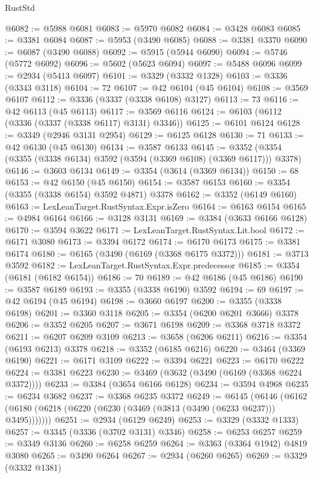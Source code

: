 \begin{lexlean}{RustStd}
\begin{coremodule}
@6082 := @5988 @6081
@6083 := @5970 @6082
@6084 := @3428 @6083
@6085 := @3381 @6084
@6087 := @5953 (@3490 @6085)
@6088 := @3381 @3370
@6090 := @6087 (@3490 @6088)
@6092 := @5915 (@5944 @6090)
@6094 := @5746 (@5772 @6092)
@6096 := @5602 (@5623 @6094)
@6097 := @5488 @6096
@6099 := @2934 (@5413 @6097)
@6101 := @3329 (@3332 @1328)
@6103 := @3336 (@3343 @3118)
@6104 := 72
@6107 := @42 @6104 (@45 @6104)
@6108 := @3569 @6107
@6112 := @3336 (@3337 (@3338 @6108) @3127)
@6113 := 73
@6116 := @42 @6113 (@45 @6113)
@6117 := @3569 @6116
@6124 := @6103 (@6112 (@3336 (@3337 (@3338 @6117) @3131) @3346))
@6125 := @6101 @6124
@6128 := @3349 (@2946 @3131 @2954)
@6129 := @6125 @6128
@6130 := 71
@6133 := @42 @6130 (@45 @6130)
@6134 := @3587 @6133
@6145 := @3352 (@3354 (@3355 (@3338 @6134) @3592 (@3594 (@3369 @6108) (@3369 @6117))) @3378)
@6146 := @3603 @6134
@6149 := @3354 (@3614 (@3369 @6134))
@6150 := 68
@6153 := @42 @6150 (@45 @6150)
@6154 := @3587 @6153
@6160 := @3354 (@3355 (@3338 @6154) @3592 @4871) @3378
@6162 := @3352 (@6149 @6160)
@6163 := LexLeanTarget.RustSyntax.Expr.isZero
@6164 := @6163 @6154
@6165 := @4984 @6164
@6166 := @3128 @3131
@6169 := @3384 (@3633 @6166 @6128)
@6170 := @3594 @3622
@6171 := LexLeanTarget.RustSyntax.Lit.bool
@6172 := @6171 @3080
@6173 := @3394 @6172
@6174 := @6170 @6173
@6175 := @3381 @6174
@6180 := @6165 (@3490 (@6169 (@3368 @6175 @3372)))
@6181 := @3713 @3592
@6182 := LexLeanTarget.RustSyntax.Expr.predecessor
@6185 := @3354 (@6181 (@6182 @6154))
@6186 := 70
@6189 := @42 @6186 (@45 @6186)
@6190 := @3587 @6189
@6193 := @3355 (@3338 @6190) @3592
@6194 := 69
@6197 := @42 @6194 (@45 @6194)
@6198 := @3660 @6197
@6200 := @3355 (@3338 @6198)
@6201 := @3360 @3118
@6205 := @3354 (@6200 @6201 @3666) @3378
@6206 := @3352 @6205
@6207 := @3671 @6198
@6209 := @3368 @3718 @3372
@6211 := @6207 @6209 @3109
@6213 := @3658 (@6206 @6211)
@6216 := @3354 (@6193 @6213) @3378
@6218 := @3352 (@6185 @6216)
@6220 := @3464 (@3369 @6190)
@6221 := @6171 @3109
@6222 := @3394 @6221
@6223 := @6170 @6222
@6224 := @3381 @6223
@6230 := @3469 (@3632 (@3490 (@6169 (@3368 @6224 @3372))))
@6233 := @3384 (@3654 @6166 @6128)
@6234 := @3594 @4968
@6235 := @6234 @3682
@6237 := @3368 @6235 @3372
@6249 := @6145
    (@6146 (@6162 (@6180 (@6218 (@6220 (@6230 (@3469 (@3813 (@3490 (@6233 @6237))) @3495)))))))
@6251 := @2934 (@6129 @6249)
@6253 := @3329 (@3332 @1333)
@6257 := @3345 (@3336 (@3702 @3131) @3346)
@6258 := @6253 @6257
@6259 := @3349 @3136
@6260 := @6258 @6259
@6264 := @3363 (@3364 @1942) @4819 @3080
@6265 := @3490 @6264
@6267 := @2934 (@6260 @6265)
@6269 := @3329 (@3332 @1381)

\end{coremodule}
\end{lexlean}
